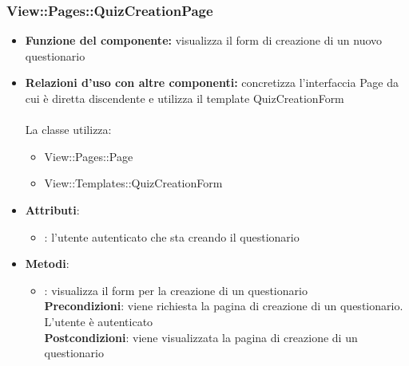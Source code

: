 \subsubsection{View::Pages::QuizCreationPage}
\begin{itemize}
\item\textbf{Funzione del componente:} visualizza il form di creazione di un nuovo questionario
				\item\textbf{Relazioni d'uso con altre componenti:} concretizza l'interfaccia Page da cui è diretta discendente e utilizza il template QuizCreationForm\\ \\
La classe utilizza:
	\begin{itemize}
		\item View::Pages::Page\\
		\item View::Templates::QuizCreationForm\\
	\end{itemize}
\item\textbf{Attributi}:
	\begin{itemize}
		\item{}: l'utente autenticato che sta creando il questionario\\
	\end{itemize}
\item\textbf{Metodi}:
	\begin{itemize}
		\item{}: visualizza il form per la creazione di un questionario\\
		\textbf{Precondizioni}: viene richiesta la pagina di creazione di un questionario. L'utente è autenticato\\
		\textbf{Postcondizioni}: viene visualizzata la pagina di creazione di un questionario\\
	\end{itemize}
\end{itemize}


